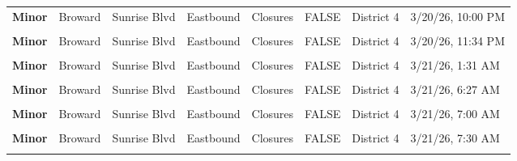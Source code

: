 \documentclass[
]{article}
\begin{document}
\begin{longtable}[t]{>{\raggedright\arraybackslash}p{1.5cm}>{\raggedright\arraybackslash}p{2.5cm}>{\raggedright\arraybackslash}p{3cm}>{\raggedright\arraybackslash}p{1.8cm}>{\raggedright\arraybackslash}p{2.5cm}lll}
\addlinespace
\textbf{Minor} & Broward & Sunrise Blvd & Eastbound & Closures & FALSE & District 4 & 3/20/26, 10:00 PM\\
\textbf{\cellcolor{gray!10}{Minor}} & \cellcolor{gray!10}{Broward} & \cellcolor{gray!10}{Sunrise Blvd} & \cellcolor{gray!10}{Westbound} & \cellcolor{gray!10}{Closures} & \cellcolor{gray!10}{FALSE} & \cellcolor{gray!10}{District 4} & \cellcolor{gray!10}{3/20/26, 10:00 PM}\\
\textbf{Minor} & Broward & Sunrise Blvd & Eastbound & Closures & FALSE & District 4 & 3/20/26, 11:34 PM\\
\textbf{\cellcolor{gray!10}{Minor}} & \cellcolor{gray!10}{Broward} & \cellcolor{gray!10}{Sunrise Blvd} & \cellcolor{gray!10}{Westbound} & \cellcolor{gray!10}{Closures} & \cellcolor{gray!10}{FALSE} & \cellcolor{gray!10}{District 4} & \cellcolor{gray!10}{3/20/26, 11:34 PM}\\
\textbf{Minor} & Broward & Sunrise Blvd & Eastbound & Closures & FALSE & District 4 & 3/21/26, 1:31 AM\\
\addlinespace
\textbf{\cellcolor{gray!10}{Minor}} & \cellcolor{gray!10}{Broward} & \cellcolor{gray!10}{Sunrise Blvd} & \cellcolor{gray!10}{Westbound} & \cellcolor{gray!10}{Closures} & \cellcolor{gray!10}{FALSE} & \cellcolor{gray!10}{District 4} & \cellcolor{gray!10}{3/21/26, 1:31 AM}\\
\textbf{Minor} & Broward & Sunrise Blvd & Eastbound & Closures & FALSE & District 4 & 3/21/26, 6:27 AM\\
\textbf{\cellcolor{gray!10}{Minor}} & \cellcolor{gray!10}{Broward} & \cellcolor{gray!10}{Sunrise Blvd} & \cellcolor{gray!10}{Westbound} & \cellcolor{gray!10}{Closures} & \cellcolor{gray!10}{FALSE} & \cellcolor{gray!10}{District 4} & \cellcolor{gray!10}{3/21/26, 6:28 AM}\\
\textbf{Minor} & Broward & Sunrise Blvd & Eastbound & Closures & FALSE & District 4 & 3/21/26, 7:00 AM\\
\textbf{\cellcolor{gray!10}{Minor}} & \cellcolor{gray!10}{Broward} & \cellcolor{gray!10}{Sunrise Blvd} & \cellcolor{gray!10}{Westbound} & \cellcolor{gray!10}{Closures} & \cellcolor{gray!10}{FALSE} & \cellcolor{gray!10}{District 4} & \cellcolor{gray!10}{3/21/26, 7:00 AM}\\
\addlinespace
\textbf{Minor} & Broward & Sunrise Blvd & Eastbound & Closures & FALSE & District 4 & 3/21/26, 7:30 AM\\
\textbf{\cellcolor{gray!10}{Minor}} & \cellcolor{gray!10}{Broward} & \cellcolor{gray!10}{Sunrise Blvd} & \cellcolor{gray!10}{Westbound} & \cellcolor{gray!10}{Closures} & \cellcolor{gray!10}{FALSE} & \cellcolor{gray!10}{District 4} & \cellcolor{gray!10}{3/21/26, 7:30 AM}\\

\end{longtable}
\end{document}
